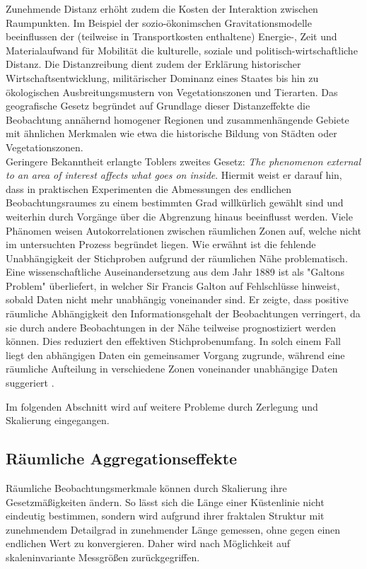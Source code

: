Zunehmende Distanz erhöht zudem die Kosten der Interaktion zwischen Raumpunkten. 
Im Beispiel der sozio-ökonimschen Gravitationsmodelle beeinflussen 
der (teilweise in Transportkosten enthaltene) Energie-, Zeit und Materialaufwand für Mobilität  
die kulturelle, soziale und politisch-wirtschaftliche Distanz.
Die Distanzreibung dient zudem der Erklärung historischer Wirtschaftsentwicklung, 
militärischer Dominanz eines Staates 
bis hin zu ökologischen Ausbreitungsmustern von Vegetationszonen und Tierarten. 
Das geografische Gesetz begründet auf Grundlage dieser Distanzeffekte die Beobachtung annähernd 
homogener Regionen und zusammenhängende Gebiete mit 
ähnlichen Merkmalen wie etwa die historische Bildung von Städten oder Vegetationszonen.\\

Geringere Bekanntheit erlangte Toblers zweites Gesetz: 
\glqq\textit{The phenomenon external to an area 
of interest affects what goes on inside}\grqq{}.
Hiermit weist er darauf hin, dass in praktischen Experimenten die Abmessungen des endlichen 
Beobachtungsraumes zu einem bestimmten Grad willkürlich gewählt sind und weiterhin durch Vorgänge über 
die Abgrenzung hinaus beeinflusst werden. 
Viele Phänomen weisen Autokorrelationen zwischen räumlichen Zonen auf, welche nicht im untersuchten Prozess begründet liegen.
Wie erwähnt ist die fehlende Unabhängigkeit der Stichproben aufgrund der räumlichen Nähe problematisch. 
Eine wissenschaftliche Auseinandersetzung aus dem Jahr 1889 ist als "Galtons Problem" überliefert, in welcher Sir Francis Galton auf Fehlschlüsse hinweist, sobald Daten nicht mehr unabhängig voneinander sind.
Er zeigte, dass positive räumliche Abhängigkeit den Informationsgehalt der Beobachtungen verringert, 
da sie durch andere Beobachtungen in der Nähe teilweise prognostiziert werden können. 
Dies reduziert den effektiven Stichprobenumfang. In solch einem Fall liegt den abhängigen Daten ein gemeinsamer Vorgang zugrunde, 
während eine räumliche Aufteilung in verschiedene Zonen voneinander unabhängige Daten suggeriert \cite[S. 264]{bivand_applied_2013}.

Im folgenden Abschnitt wird auf weitere Probleme durch Zerlegung und Skalierung eingegangen.

\subsection*{Räumliche Aggregationseffekte}
\label{ch:aggregation}
Räumliche Beobachtungsmerkmale können durch Skalierung ihre Gesetzmäßigkeiten ändern. 
So lässt sich die Länge einer Küstenlinie nicht eindeutig bestimmen, sondern wird aufgrund ihrer 
fraktalen Struktur mit zunehmendem Detailgrad in zunehmender Länge gemessen, 
ohne gegen einen endlichen Wert zu konvergieren. 
Daher wird nach Möglichkeit auf skaleninvariante Messgrößen zurückgegriffen.

